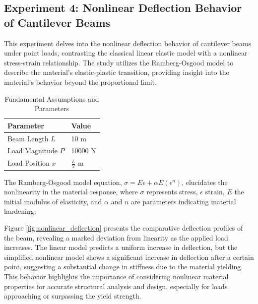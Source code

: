 \documentclass[conference]{IEEEtran}
\begin{document}
\subsection{Experiment 4: Nonlinear Deflection Behavior of Cantilever Beams}
This experiment delves into the nonlinear deflection behavior of cantilever beams under point loads, contrasting the classical linear elastic model with a nonlinear stress-strain relationship. The study utilizes the Ramberg-Osgood model to describe the material's elastic-plastic transition, providing insight into the material's behavior beyond the proportional limit.

\begin{table}[ht]
\centering
\caption{Fundamental Assumptions and Parameters}
\label{tab:experiment4params}
\begin{tabular}{l l}
\hline
\textbf{Parameter} & \textbf{Value} \\
\hline
Beam Length \( L \)         & 10 m                    \\
Load Magnitude \( P \)      & 10000 N                 \\
Load Position \( x \)       & \( \frac{L}{2} \) m     \\
\hline
\end{tabular}
\end{table}

The Ramberg-Osgood model equation, \(\sigma = E\epsilon + \alpha E (\epsilon^{n})\), elucidates the nonlinearity in the material response, where \(\sigma\) represents stress, \(\epsilon\) strain, \(E\) the initial modulus of elasticity, and \(\alpha\) and \(n\) are parameters indicating material hardening.

Figure \ref{fig:nonlinear_deflection} presents the comparative deflection profiles of the beam, revealing a marked deviation from linearity as the applied load increases. The linear model predicts a uniform increase in deflection, but the simplified nonlinear model shows a significant increase in deflection after a certain point, suggesting a substantial change in stiffness due to the material yielding. This behavior highlights the importance of considering nonlinear material properties for accurate structural analysis and design, especially for loads approaching or surpassing the yield strength.
\end{document}
